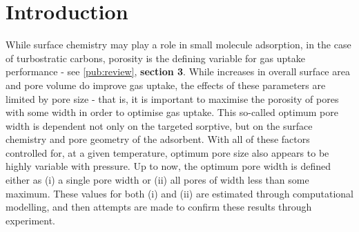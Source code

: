 \newpage
\section{Introduction}
While surface chemistry may play a role in small molecule \gls{adsorption},\citep{Lueking2004, Li2011a, Li2020Sustainable, wang2012significantly, Botome2017Preparation, liang2013, Kayal2018Activated} in the case of \glspl{turbostratic carbon}, porosity is the defining variable for gas uptake performance\citep{Sevilla2014Energy, Adeniran2016Is, Sevilla2013Assessment, Choi2019Unique, Lee2013Determination, Presser2011Effect, Wickramaratne2013Importance} - see \ref{pub:review}, \textbf{section 3}. While increases in overall surface area and pore volume do improve gas uptake,\citep{Cox2017Ultra, Blankenship2017Cigarette} the effects of these parameters are limited by pore size\citep{Sevilla2014Energy, Sevilla2013Assessment} \citep{Choi2019Unique, Li2019Selective, Cabria2007optimum, Gogotsi2009, Masika2012} - that is, it is important to maximise the porosity of pores with some width in order to optimise gas uptake. This so-called optimum pore width is dependent not only on the targeted sorptive,\citep{Presser2011Effect, Biloe2002Optimal, Cabria2007optimum} but on the surface chemistry\citep{wang2012significantly, Kayal2018Activated, Lueking2004} and pore geometry\citep{Rzepka1998Physisorption, Zhou2004comparative, Hlushak2018Heat} of the \gls{adsorbent}. With all of these factors controlled for, at a given temperature, optimum pore size also appears to be highly variable with pressure.\citep{Presser2011Effect, DelaCasaLillo2002Hydrogen} Up to now, the optimum pore width is defined either as (i) a single pore width\citep{Sevilla2014Energy, Choi2019Unique, Li2019Selective} or (ii) all pores of width less than some maximum.\citep{Biloe2002Optimal, Cabria2007optimum, Presser2011Effect} These values for both (i) and (ii) are estimated through computational modelling,\citep{Biloe2002Optimal, Cabria2007optimum, Hlushak2018Heat} and then attempts are made to confirm these results through experiment.\citep{Choi2019Unique, Presser2011Effect}

